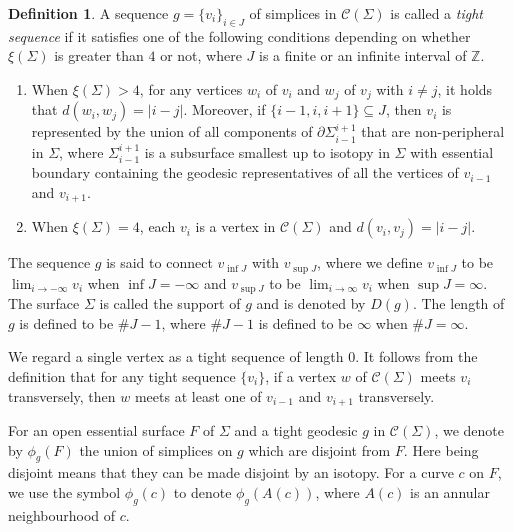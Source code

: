 \documentclass{amsart}
\theoremstyle{definition}
\newtheorem{definition}[theorem]{Definition}
\numberwithin{figure}{section}
\numberwithin{equation}{section}
\newcommand{\blackboard}[1]{\ensuremath{\mathbb{#1}}}
\newcommand{\complexes}{\blackboard{C}}
\newcommand{\integers}{\blackboard{Z}} %
\def\zz{\integers}
\def\cc{\complexes}
\def\cc{\mathcal{C}}
\def\part{\partial}
\begin{document}
\begin{definition}
A sequence $g=\{v_i\}_{i\in J}$ of simplices in $\cc(\Sigma)$ is called a \emph{tight sequence} if it satisfies 
one of the following conditions depending on whether $\xi(\Sigma)$ is greater than $4$ or not, where $J$ is a finite or an infinite interval of $\zz$.
\begin{enumerate}[\rm (i)]
\item
When $\xi(\Sigma)>4$, for any vertices $w_i$ of $v_i$ and $w_j$ of $v_j$ with $i\neq j$, it holds that $d(w_i,w_j)=|i-j|$.
Moreover, if $\{i-1,i,i+1\}\subseteq J$, then $v_i$ is represented by the union of all components of $\part \Sigma_{i-1}^{i+1}$ 
that are non-peripheral in $\Sigma$, where $\Sigma_{i-1}^{i+1}$ is a  subsurface smallest up to isotopy in $\Sigma$ with essential boundary 
 containing the geodesic representatives of all the vertices of $v_{i-1}$ and $v_{i+1}$.
\item
When $\xi(\Sigma)=4$, each $v_i$ is a vertex in $\cc(\Sigma)$ and  $d(v_i,v_j)=|i-j|$. 
\end{enumerate}

The sequence $g$ is said to connect $v_{\inf J}$ with $v_{\sup J}$, where we define $v_{\inf J}$ to be $\lim_{i \rightarrow -\infty} v_i$ when $\inf J=-\infty$ and $v_{\sup J}$ to be $\lim_{i \rightarrow \infty} v_i$ when $\sup J=\infty$.
The surface $\Sigma$ is called the support of $g$ and is denoted by $D(g)$.
The length of $g$ is defined to be $\# J-1$, where $\#J-1$ is defined to be $\infty$ when $\# J=\infty$.
\end{definition}

\smallskip
We regard a single vertex as a tight sequence of length $0$.
It follows from the definition that  for any tight sequence $\{v_i\}$, if a vertex $w$ of $\cc(\Sigma)$ meets $v_i$ transversely, then 
$w$ meets at least one of $v_{i-1}$ and $v_{i+1}$ transversely.

\smallskip

For an open essential surface $F$ of  $\Sigma$ and a tight geodesic $g$ in $\cc(\Sigma)$, we denote by $\phi_g(F)$ the union of simplices on $g$ which are disjoint from $F$.
Here being disjoint means that they can be made disjoint by an isotopy.
For a curve $c$ on $F$, we use the symbol $\phi_g(c)$ to denote $\phi_g(A(c))$, where $A(c)$ is an annular neighbourhood of $c$.
\end{document}

